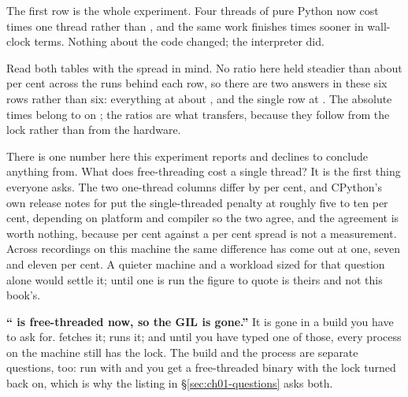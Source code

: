 \noindent
The first row is the whole experiment. Four threads of pure Python now cost
 times one thread rather than
, and the same work finishes
 times sooner in wall-clock terms. Nothing about
the code changed; the interpreter did.

\begin{warning}
Read both tables with the spread in mind. No ratio here held steadier than
about  per cent across the  runs behind each
row, so there are two answers in these six rows rather than six: everything
at about , and the single row at
. The absolute times belong to
 on ; the ratios are what
transfers, because they follow from the lock rather than from the hardware.

There is one number here this experiment reports and declines to conclude
anything from. What does free-threading cost a single thread? It is the first
thing everyone asks. The two one-thread columns differ by
 per cent, and CPython's own release notes for
\pypatch{} put the single-threaded penalty at roughly five to ten per cent,
depending on platform and compiler \dash{} so the two agree, and the
agreement is worth nothing, because  per cent against a
 per cent spread is not a measurement. Across recordings on
this machine the same difference has come out at one, seven and eleven per
cent. A quieter machine and a workload sized for that question alone would
settle it; until one is run the figure to quote is theirs and not this
book's.
\end{warning}


\begin{trapbox}
\textbf{\enquote{\pyver{} is free-threaded now, so the GIL is gone.}} It is
gone in a build you have to ask for.  fetches it;  runs it; and until you have typed one
of those, every process on the machine still has the lock. The build and the
process are separate questions, too: run  with
 and you get a free-threaded binary with the lock turned
back on, which is why the listing in \S\ref{sec:ch01-questions} asks both.
\end{trapbox}


